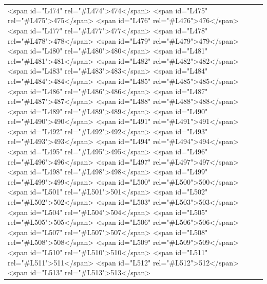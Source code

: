 \documentclass[a4paper,11pt,french]{article}
\begin{document}
\begin{tabular}{|m{8cm}|m{8cm}|}
<span id="L474" rel="#L474">474</span>
<span id="L475" rel="#L475">475</span>
<span id="L476" rel="#L476">476</span>
<span id="L477" rel="#L477">477</span>
<span id="L478" rel="#L478">478</span>
<span id="L479" rel="#L479">479</span>
<span id="L480" rel="#L480">480</span>
<span id="L481" rel="#L481">481</span>
<span id="L482" rel="#L482">482</span>
<span id="L483" rel="#L483">483</span>
<span id="L484" rel="#L484">484</span>
<span id="L485" rel="#L485">485</span>
<span id="L486" rel="#L486">486</span>
<span id="L487" rel="#L487">487</span>
<span id="L488" rel="#L488">488</span>
<span id="L489" rel="#L489">489</span>
<span id="L490" rel="#L490">490</span>
<span id="L491" rel="#L491">491</span>
<span id="L492" rel="#L492">492</span>
<span id="L493" rel="#L493">493</span>
<span id="L494" rel="#L494">494</span>
<span id="L495" rel="#L495">495</span>
<span id="L496" rel="#L496">496</span>
<span id="L497" rel="#L497">497</span>
<span id="L498" rel="#L498">498</span>
<span id="L499" rel="#L499">499</span>
<span id="L500" rel="#L500">500</span>
<span id="L501" rel="#L501">501</span>
<span id="L502" rel="#L502">502</span>
<span id="L503" rel="#L503">503</span>
<span id="L504" rel="#L504">504</span>
<span id="L505" rel="#L505">505</span>
<span id="L506" rel="#L506">506</span>
<span id="L507" rel="#L507">507</span>
<span id="L508" rel="#L508">508</span>
<span id="L509" rel="#L509">509</span>
<span id="L510" rel="#L510">510</span>
<span id="L511" rel="#L511">511</span>
<span id="L512" rel="#L512">512</span>
<span id="L513" rel="#L513">513</span>


\end{tabular}
\end{document}
